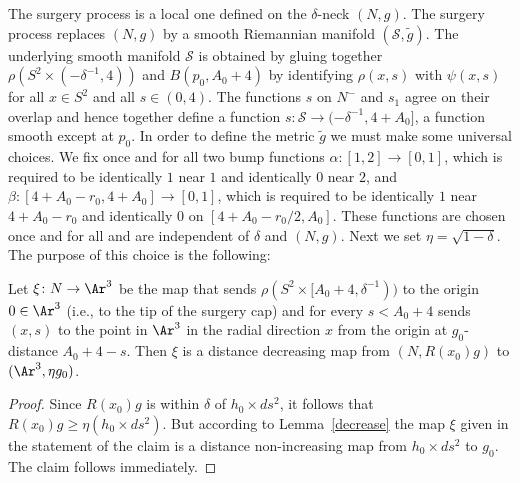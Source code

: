 The surgery process is a local
one defined on the $\delta$-neck $(N,g)$. The surgery process
replaces  $(N,g)$ by a smooth Riemannian manifold $({\mathcal
S},\widetilde g)$. The underlying smooth manifold ${\mathcal S}$ is
obtained by gluing together $\rho(S^2\times(-\delta^{-1},4))$ and
$B(p_0,A_0+4)$ by identifying $\rho(x,s)$ with $\psi(x,s)$ for all
$x\in S^2$ and all $s\in (0,4)$. The functions $s$ on $ N^-$ and
$s_1$ agree on their overlap and hence together define a function
$s\colon {\mathcal S}\to (-\delta^{-1},4+A_0]$, a function smooth
except at $p_0$. In order to define the metric $\widetilde g$ we
must make some universal choices. We fix once and for all two bump
functions $\alpha\colon [1,2]\to [0,1]$, which is required to be
identically $1$ near $1$ and identically $0$ near $2$, and
$\beta\colon [4+A_0-r_0,4+A_0]\to [0,1]$, which is required to be
identically $1$ near $4+A_0-r_0$ and identically $0$ on
$[4+A_0-r_0/2,A_0]$. These functions are chosen once and for all and
are independent of $\delta$ and $(N,g)$. Next we set
$\eta=\sqrt{1-\delta}$.
The purpose of this choice is the following:

\begin{claim}
\label{claim:neck-to-cap-distance-decreasing}\label{distdecrease}
Let $\xi\colon N\to \Ar^3 $ be the map that sends $\rho(S^2\times
[A_0+4,\delta^{-1}))$ to the origin $0\in \Ar^3$ (i.e., to the tip of
the surgery cap) and for every $s<A_0+4$ sends $(x,s)$ to the point
in $\Ar^3$ in the radial direction $x$ from the origin at
$g_0$-distance $A_0+4-s$. Then $\xi$ is a distance decreasing map
from $(N,R(x_0)g)$ to $(\Ar^3,\eta g_0)$.
\end{claim}

\begin{proof}
Since $R(x_0)g$ is within $\delta$ of $h_0\times ds^2$, it follows
that $R(x_0)g\ge \eta (h_0\times ds^2)$. But according to
Lemma~\ref{decrease} the map $\xi$ given in the statement of the
claim is a distance non-increasing map from $h_0\times ds^2$ to
$g_0$. The claim follows immediately.
\end{proof}


